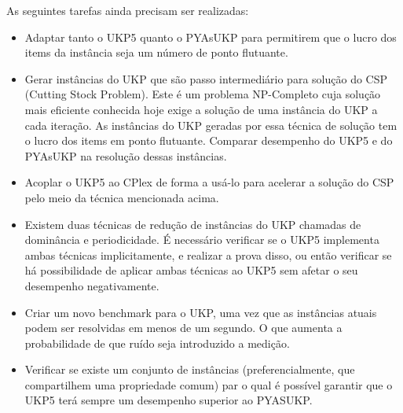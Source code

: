 \documentclass[12pt]{article}
\begin{document}
As seguintes tarefas ainda precisam ser realizadas:

\begin{itemize}
  \item Adaptar tanto o UKP5 quanto o PYAsUKP para permitirem que o lucro dos items da instância seja um número de ponto flutuante.
  \item Gerar instâncias do UKP que são passo intermediário para solução do CSP (Cutting Stock Problem). Este é um problema NP-Completo cuja solução mais eficiente conhecida hoje exige a solução de uma instância do UKP a cada iteração. As instâncias do UKP geradas por essa técnica de solução tem o lucro dos items em ponto flutuante. Comparar desempenho do UKP5 e do PYAsUKP na resolução dessas instâncias.
  \item Acoplar o UKP5 ao CPlex de forma a usá-lo para acelerar a solução do CSP pelo meio da técnica mencionada acima.
  \item Existem duas técnicas de redução de instâncias do UKP chamadas de dominância e periodicidade. É necessário verificar se o UKP5 implementa ambas técnicas implicitamente, e realizar a prova disso, ou então verificar se há possibilidade de aplicar ambas técnicas ao UKP5 sem afetar o seu desempenho negativamente.
  \item Criar um novo benchmark para o UKP, uma vez que as instâncias atuais podem ser resolvidas em menos de um segundo. O que aumenta a probabilidade de que ruído seja introduzido a medição.
  \item Verificar se existe um conjunto de instâncias (preferencialmente, que compartilhem uma propriedade comum) par o qual é possível garantir que o UKP5 terá sempre um desempenho superior ao PYASUKP.
\end{itemize}



\end{document}
